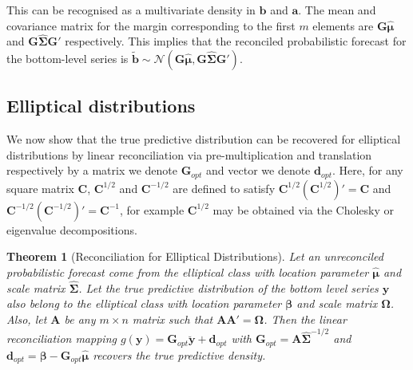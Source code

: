 \documentclass[12pt]{article}
\def\PQ{\begin{pmatrix}\bm{G}\\[-0.2cm]\bm{G}'_{\perp}\end{pmatrix}}
\newtheorem{theo}{Theorem}[section]
\theoremstyle{definition}
\begin{document}

This can be recognised as a multivariate density in $\bm{b}$ and $\bm{a}$.  The mean and covariance matrix for the margin corresponding to the first $m$ elements are $\bm{G}\hat{\bm{\mu}}$ and $\bm{G}\hat{\bm{\Sigma}}\bm{G}'$ respectively.  This implies that the reconciled probabilistic forecast for the bottom-level series is $\tilde{\bm{b}} \sim \mathcal{N}(\bm{G}\hat{\bm{\mu}}, \bm{G}\hat{\bm{\Sigma}}\bm{G}')$. 



\subsection{Elliptical distributions}

We now show that the true predictive distribution can be recovered for elliptical distributions by linear reconciliation via pre-multiplication and translation respectively by a matrix we denote ${\bm G}_{opt}$ and vector we denote ${\bm d}_{opt}$. Here, for any square matrix $\bm{C}$, $\bm{C}^{1/2}$ and $\bm{C}^{-1/2}$ are defined to satisfy $\bm{C}^{1/2}(\bm{C}^{1/2})'=\bm{C}$ and $\bm{C}^{-1/2}(\bm{C}^{-1/2})'=\bm{C}^{-1}$, for example $\bm{C}^{1/2}$ may be obtained via the Cholesky or eigenvalue decompositions.

\begin{theo}[Reconciliation for Elliptical Distributions]
	Let an unreconciled probabilistic forecast come from the elliptical class with location parameter $\hat{\bm{\mu}}$ and scale matrix $\hat{\bm{\Sigma}}$. Let the true predictive distribution of the bottom level series $\bm{y}$ also belong to the elliptical class with location parameter $\bm{\beta}$ and scale matrix $\bm{\Omega}$. Also, let ${\bm{A}}$ be any $m\times n$ matrix such that ${\bm{A}}{\bm{A}}'=\bm{\Omega}$. Then the linear reconciliation mapping $g({\bm{y}})=\bm{G}_{opt}\breve{\bm{y}}+\bm{d}_{opt}$ with $\bm{G}_{opt}={\bm{A}}\hat{\bm\Sigma}^{-1/2}$ and $\bm{d}_{opt}=\bm{\beta}-\bm{G}_{opt}\hat{\bm{\mu}}$ recovers the true predictive density.
\end{theo}
\end{document}
